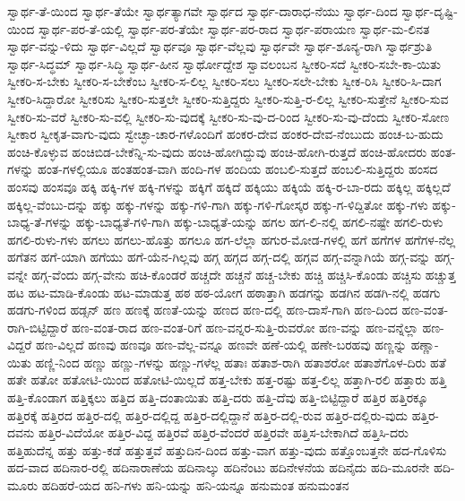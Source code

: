 {ಸ್ವಾರ್ಥ-ತೆ-ಯಿಂದ
ಸ್ವಾರ್ಥ-ತೆಯೇ
ಸ್ವಾರ್ಥತ್ಯಾಗವೇ
ಸ್ವಾರ್ಥದ
ಸ್ವಾರ್ಥ-ದಾರಾಧ-ನೆಯು
ಸ್ವಾರ್ಥ-ದಿಂದ
ಸ್ವಾರ್ಥ-ದೃಷ್ಟಿ-ಯಿಂದ
ಸ್ವಾರ್ಥ-ಪರ-ತೆ-ಯಲ್ಲಿ
ಸ್ವಾರ್ಥ-ಪರ-ತೆಯೇ
ಸ್ವಾರ್ಥ-ಪರ-ರಾದ
ಸ್ವಾರ್ಥ-ಪರಾಯಣ
ಸ್ವಾರ್ಥ-ಮ-ಲಿನತ
ಸ್ವಾರ್ಥ-ವನ್ನು-ಳಿದು
ಸ್ವಾರ್ಥ-ವಿಲ್ಲದೆ
ಸ್ವಾರ್ಥವೂ
ಸ್ವಾರ್ಥ-ವೆಲ್ಲವು
ಸ್ವಾರ್ಥವೇ
ಸ್ವಾರ್ಥ-ಶೂನ್ಯ-ರಾಗಿ
ಸ್ವಾರ್ಥಶ್ರುತಿ
ಸ್ವಾರ್ಥ-ಸಿದ್ಧಮ್
ಸ್ವಾರ್ಥ-ಸಿದ್ಧಿ
ಸ್ವಾರ್ಥ-ಹೀನ
ಸ್ವಾರ್ಥೋದ್ದೇಶ
ಸ್ವಾವಲಂಬನ
ಸ್ವೀಕರಿ-ಸದೆ
ಸ್ವೀಕರಿ-ಸಬೇ-ಕಾ-ಯಿತು
ಸ್ವೀಕರಿ-ಸ-ಬೇಕು
ಸ್ವೀಕರಿ-ಸ-ಬೇಕೆಂಬ
ಸ್ವೀಕರಿ-ಸ-ಲಿಲ್ಲ
ಸ್ವೀಕರಿ-ಸಲು
ಸ್ವೀಕರಿ-ಸಲೇ-ಬೇಕು
ಸ್ವೀಕ-ರಿಸಿ
ಸ್ವೀಕರಿ-ಸಿ-ದಾಗ
ಸ್ವೀಕರಿ-ಸಿದ್ದಾರೋ
ಸ್ವೀಕರಿಸು
ಸ್ವೀಕರಿ-ಸುತ್ತಲೇ
ಸ್ವೀಕರಿ-ಸುತ್ತಿದ್ದರು
ಸ್ವೀಕರಿ-ಸುತ್ತಿ-ರ-ಲಿಲ್ಲ
ಸ್ವೀಕರಿ-ಸುತ್ತೇನೆ
ಸ್ವೀಕರಿ-ಸುವ
ಸ್ವೀಕರಿ-ಸು-ವರೆ
ಸ್ವೀಕರಿ-ಸು-ವಲ್ಲಿ
ಸ್ವೀಕರಿ-ಸು-ವುದಕ್ಕೆ
ಸ್ವೀಕರಿ-ಸು-ವು-ದ-ರಿಂದ
ಸ್ವೀಕರಿ-ಸು-ವು-ದೆಂದು
ಸ್ವೀಕರಿ-ಸೋಣ
ಸ್ವೀಕಾರ
ಸ್ವೀಕೃತ-ವಾಗು-ವುದು
ಸ್ವೇಚ್ಛಾ-ಚಾರ-ಗಳೊಂದಿಗೆ
ಹಂಕರ-ದೇವ
ಹಂಕರ-ದೇವ-ನೆಂಬುದು
ಹಂಚ-ಬ-ಹುದು
ಹಂಚಿ-ಕೊಳ್ಳುವ
ಹಂಚಿಬಿಡ-ಬೇಕೆನ್ನಿ-ಸು-ವುದು
ಹಂಚಿ-ಹೋಗಿದ್ದುವು
ಹಂಚಿ-ಹೋಗಿ-ರುತ್ತದೆ
ಹಂಚಿ-ಹೋದರು
ಹಂತ-ಗಳನ್ನು
ಹಂತ-ಗಳಲ್ಲಿಯೂ
ಹಂತಹಂತ-ವಾಗಿ
ಹಂದಿ-ಗಳ
ಹಂದಿಯ
ಹಂಬಲಿ-ಸುತ್ತದೆ
ಹಂಬಲಿ-ಸುತ್ತಿದ್ದರು
ಹಂಸದ
ಹಂಸವು
ಹಂಸವೂ
ಹಕ್ಕಿ
ಹಕ್ಕಿ-ಗಳ
ಹಕ್ಕಿ-ಗಳನ್ನು
ಹಕ್ಕಿಗೆ
ಹಕ್ಕಿದೆ
ಹಕ್ಕಿಯು
ಹಕ್ಕಿಯೆ
ಹಕ್ಕಿ-ರ-ಬಾ-ರದು
ಹಕ್ಕಿಲ್ಲ
ಹಕ್ಕಿಲ್ಲದೆ
ಹಕ್ಕಿಲ್ಲ-ವೆಂಬು-ದನ್ನು
ಹಕ್ಕು
ಹಕ್ಕು-ಗಳನ್ನು
ಹಕ್ಕು-ಗಳಿ-ಗಾಗಿ
ಹಕ್ಕು-ಗಳಿ-ಗೋಸ್ಕರ
ಹಕ್ಕು-ಗ-ಳಿದ್ದಿತೋ
ಹಕ್ಕು-ಗಳು
ಹಕ್ಕು-ಬಾಧ್ಯ-ತೆ-ಗಳನ್ನು
ಹಕ್ಕು-ಬಾಧ್ಯತೆ-ಗಳಿ-ಗಾಗಿ
ಹಕ್ಕು-ಬಾಧ್ಯತೆ-ಯನ್ನು
ಹಗಲ
ಹಗ-ಲಿ-ನಲ್ಲಿ
ಹಗಲಿ-ನಷ್ಟೇ
ಹಗಲಿ-ರುಳು
ಹಗಲಿ-ರುಳು-ಗಳು
ಹಗಲು
ಹಗಲು-ಹೊತ್ತು
ಹಗಲೂ
ಹಗ-ಲೆಲ್ಲಾ
ಹಗುರ-ಮೋಡ-ಗಳಲ್ಲಿ
ಹಗೆ
ಹಗೆಗಳ
ಹಗೆಗಳ-ನೆಲ್ಲ
ಹಗೆತನ
ಹಗೆ-ಯಾಗಿ
ಹಗೆಯು
ಹಗೆ-ಯೆನ-ಗಿಲ್ಲವು
ಹಗ್ಗ
ಹಗ್ಗದ
ಹಗ್ಗ-ದಲ್ಲಿ
ಹಗ್ಗವ
ಹಗ್ಗ-ವನ್ನಾಗಿಯೆ
ಹಗ್ಗ-ವನ್ನು
ಹಗ್ಗ-ವನ್ನೇ
ಹಗ್ಗ-ವೆಂದು
ಹಗ್ಗ-ವೇನು
ಹಚಿ-ಕೊಂಡರೆ
ಹಚ್ಚದೇ
ಹಚ್ಚನೆ
ಹಚ್ಚ-ಬೇಕು
ಹಚ್ಚಿ
ಹಚ್ಚಿಸಿ-ಕೊಂಡು
ಹಚ್ಚಿಸು
ಹಚ್ಚುತ್ತ
ಹಟ
ಹಟ-ಮಾಡಿ-ಕೊಂಡು
ಹಟ-ಮಾಡುತ್ತ
ಹಠ
ಹಠ-ಯೋಗ
ಹಠಾತ್ತಾಗಿ
ಹಡಗನ್ನು
ಹಡಗಿನ
ಹಡಗಿ-ನಲ್ಲಿ
ಹಡಗು
ಹಡಗು-ಗಳಿಂದ
ಹಡ್ಸನ್
ಹಣ
ಹಣಕ್ಕೆ
ಹಣತೆ-ಯನ್ನು
ಹಣದ
ಹಣ-ದಲ್ಲಿ
ಹಣ-ದಾಸೆ-ಗಾಗಿ
ಹಣ-ದಿಂದ
ಹಣ-ವಂತ-ರಾಗಿ-ಬಿಟ್ಟಿದ್ದಾರೆ
ಹಣ-ವಂತ-ರಾದ
ಹಣ-ವಂತ-ರಿಗೆ
ಹಣ-ವನ್ನರ-ಸುತ್ತಿ-ರುವರೋ
ಹಣ-ವನ್ನು
ಹಣ-ವನ್ನೆಲ್ಲಾ
ಹಣ-ವಿದ್ದರೆ
ಹಣ-ವಿಲ್ಲದೆ
ಹಣವು
ಹಣವೂ
ಹಣ-ವೆಲ್ಲ-ವನ್ನೂ
ಹಣವೇ
ಹಣೆ-ಯಲ್ಲಿ
ಹಣೇ-ಬರಹವು
ಹಣ್ಣನ್ನು
ಹಣ್ಣಾ-ಯಿತು
ಹಣ್ಣಿ-ನಿಂದ
ಹಣ್ಣು
ಹಣ್ಣು-ಗಳನ್ನು
ಹಣ್ಣು-ಗಳೆಲ್ಲ
ಹತಾಃ
ಹತಾಶ-ರಾಗಿ
ಹತಾಶರೋ
ಹತಾಶೆಗೊಳ-ದಿರು
ಹತೆ
ಹತೇ
ಹತೋ
ಹತೋಟಿ-ಯಿಂದ
ಹತೋಟಿ-ಯಿಲ್ಲದೆ
ಹತ್ತ-ಬೇಕು
ಹತ್ತ-ರಷ್ಟು
ಹತ್ತ-ಲಿಲ್ಲ
ಹತ್ತಾಗಿ-ರಲಿ
ಹತ್ತಾರು
ಹತ್ತಿ
ಹತ್ತಿ-ಕೊಂಡಾಗ
ಹತ್ತಿಕ್ಕಲು
ಹತ್ತಿದ
ಹತ್ತಿ-ದಂತಾಯಿತು
ಹತ್ತಿ-ದರು
ಹತ್ತಿ-ದೆವು
ಹತ್ತಿ-ಬಿಟ್ಟಿದ್ದಾರೆ
ಹತ್ತಿರ
ಹತ್ತಿರಕ್ಕೂ
ಹತ್ತಿರಕ್ಕೆ
ಹತ್ತಿರದ
ಹತ್ತಿರ-ದಲ್ಲಿ
ಹತ್ತಿರ-ದಲ್ಲಿದ್ದ
ಹತ್ತಿರ-ದಲ್ಲಿದ್ದಾನೆ
ಹತ್ತಿರ-ದಲ್ಲಿ-ರುವ
ಹತ್ತಿರ-ದಲ್ಲಿರು-ವುದು
ಹತ್ತಿರ-ದವನು
ಹತ್ತಿರ-ವಿದೆಯೋ
ಹತ್ತಿರ-ವಿದ್ದ
ಹತ್ತಿರವೆ
ಹತ್ತಿರ-ವೆಂದರೆ
ಹತ್ತಿರವೇ
ಹತ್ತಿಸ-ಬೇಕಾಗಿದೆ
ಹತ್ತಿಸಿ-ದರು
ಹತ್ತಿಹುದೆನ್ನ
ಹತ್ತು
ಹತ್ತು-ಕಡೆ
ಹತ್ತುತ್ತವೆ
ಹತ್ತುದಿನ-ದಿಂದ
ಹತ್ತು-ವಾಗ
ಹತ್ತು-ವುದು
ಹತ್ತೊಂಬತ್ತನೇ
ಹದ-ಗೊಳಿಸು
ಹದ-ವಾದ
ಹದಿನಾರ-ರಲ್ಲಿ
ಹದಿನಾರಾಣೆಯ
ಹದಿನಾಲ್ಕು
ಹದಿನೆಂಟು
ಹದಿನೇಳನೆಯ
ಹದಿನೈದು
ಹದಿ-ಮೂರನೇ
ಹದಿ-ಮೂರು
ಹದಿಹರೆ-ಯದ
ಹನಿ-ಗಳು
ಹನಿ-ಯನ್ನು
ಹನಿ-ಯನ್ನೂ
ಹನುಮಂತ
ಹನುಮಂತನ
}
